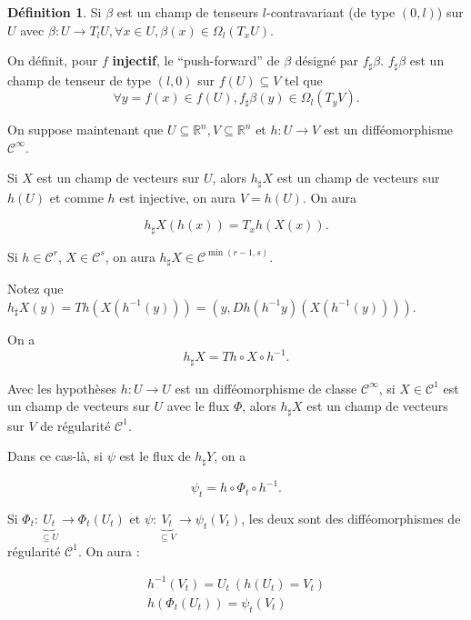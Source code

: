 \documentclass[french]{article}
\theoremstyle{definition}
\newtheorem{protodefinition}{Définition}[section]
\newenvironment{definition}
    {\colorlet{shadecolor}{green!5}\begin{shaded}\begin{protodefinition}}
    {\end{protodefinition}\end{shaded}}
\theoremstyle{remark}
\begin{document}
\begin{definition}
  Si \(\beta\) est un champ de tenseurs \(l\)-contravariant (de type \((0,l)\)) sur \(U\) avec \(\beta : U \longrightarrow T_l U, \forall x \in U, \beta(x) \in \Omega_l(T_x U)\).

  On définit, pour \(f\) \textbf{injectif}, le ``push-forward'' de \(\beta\) désigné par \(f _{\sharp}\beta\). \(f _{\sharp}\beta\) est un champ de tenseur de type \((l,0)\) sur \(f(U)\subseteq V\) tel que \[\forall y = f(x) \in f(U), f _{\sharp}\beta(y) \in \Omega _{l}(T_y V).\]
\end{definition}

On suppose maintenant que \(U \subseteq \mathbb{R}^n, V \subseteq \mathbb{R}^n\) et \(h : U \longrightarrow V\) est un difféomorphisme \(\mathcal{C}^{\infty}\).

Si \(X\) est un champ de vecteurs sur \(U\), alors \(h _{\sharp} X\) est un champ de vecteurs sur \(h(U)\) et comme \(h\) est injective, on aura \(V=h(U)\). On aura

\[h _{\sharp}X(h(x)) = T_x h(X(x)).\]

Si \(h \in \mathcal{C}^r\), \(X \in \mathcal{C}^s\), on aura \(h _{\sharp} X \in \mathcal{C}^{\min(r-1, s)}\).


Notez que \(h _{\sharp}X (y) = T h (X(h ^{-1}(y))) = (y,D h(h ^{-1}y)(X(h ^{-1}(y))))\).

On a \[h _{\sharp}X = Th \circ X \circ h ^{-1}.\]

Avec les hypothèses \(h : U \longrightarrow U\) est un difféomorphisme de classe \(\mathcal{C}^\infty\), si \(X \in \mathcal{C}^1\) est un champ de vecteurs sur \(U\) avec le flux \(\Phi\), alors \(h _{\sharp}X\) est un champ de vecteurs sur \(V\) de régularité \(\mathcal{C}^1\).

Dans ce cas-là, si \(\psi\) est le flux de \(h _{\sharp}Y\), on a

\[\psi_t = h \circ \Phi _{t} \circ h ^{-1}.\]

Si \(\Phi_t : \underbrace{U_t}_{\subseteq U} \longrightarrow \Phi_t(U_t)\) et \(\psi : \underbrace{V_t}_{\subseteq V} \longrightarrow \psi_t(V_t)\), les deux sont des difféomorphismes de régularité \(\mathcal{C}^1\). On aura :

\begin{gather*}
  h ^{-1}(V_t) = U_t \ (h(U_t) = V_t) \\
  h (\Phi_t(U_t)) = \psi_t(V_t)
\end{gather*}
\end{document}
